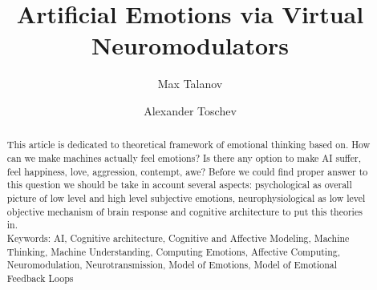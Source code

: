 \documentclass[oribibl]{llncs}
\begin{document}
\title{Artificial Emotions via Virtual Neuromodulators}
\author{Max Talanov \and Alexander Toschev}
\maketitle
\begin{abstract}
This article is dedicated to theoretical framework of emotional thinking based on.
How can we make machines actually feel emotions? Is there any option to make AI suffer, feel happiness, love, aggression, contempt, awe? Before we could find proper answer to this question we should be take in account several aspects: psychological as overall picture of low level and high level subjective emotions, neurophysiological as low level objective mechanism of brain response and cognitive architecture to put this theories in.\\
Keywords: AI, Cognitive architecture, Cognitive and Affective Modeling, Machine Thinking, Machine Understanding, Computing Emotions, Affective Computing, Neuromodulation, Neurotransmission, Model of Emotions, Model of Emotional Feedback Loops
\end{abstract}



\end{document}
